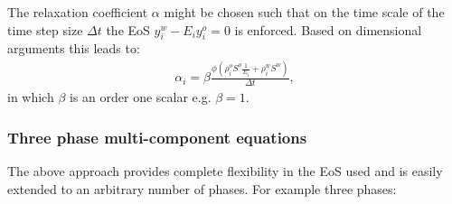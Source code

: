 The relaxation coefficient $\alpha$ might be chosen such that 
on the time scale of the time step size $\Delta t$ the EoS 
$y_i^w - E_i y_i^o=0$ is enforced. 
Based on dimensional arguments this leads to: 
\begin{eqnarray}
\alpha_i= \beta \frac{\phi (\rho_i^o S^o 
\frac{1}{E_i} 
+\rho_i^w S^w )}{\Delta t} ,
\end{eqnarray}
in which $\beta$ is an order one scalar e.g. $\beta=1$. 

\subsubsection{Three phase multi-component equations} 
\label{Three phase system} 
The above approach provides complete flexibility in the EoS used 
and is easily extended to an arbitrary number of phases. 
For example three phases: 

